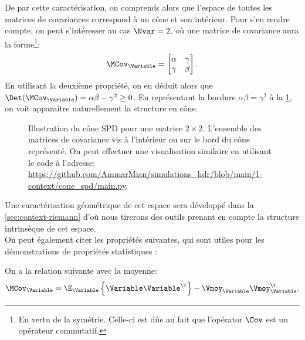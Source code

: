 \begin{remark}
De par cette caractérisation, on comprends alors que l'espace de toutes les matrices de covariances correspond à un cône et son intérieur. Pour s'en rendre compte, on peut s'intéresser au cas $\Nvar=2$, où une matrice de covariance aura la forme\footnote{En vertu de la symétrie. Celle-ci est dûe au fait que l'opérator $\Cov$ est un opérateur commutatif.}:
$$
\MCov_\Variable = \begin{bmatrix} \alpha & \gamma \\ \gamma & \beta \end{bmatrix}.
$$
En utilisant la deuxième propriété, on en déduit alors que $\Det(\MCov_\Variable) = \alpha\beta - \gamma^2 \geq 0$. En représentant la bordure $\alpha\beta=\gamma^2$ à la \cref{fig:context-figure-spdcone}, on voit apparaître naturellement la structure en cône.


\end{remark}

\begin{figure}[h]
    \begin{center}
    
  \end{center}
  \caption{Illustration du cône SPD pour une matrice $2\times 2$. L'ensemble des matrices de covariance vis à l'intérieur ou sur le bord du cône représenté. On peut effectuer une visualisation similaire en utilisant le code à l'adresse: \url{https://github.com/AmmarMian/simulations_hdr/blob/main/1-context/cone_spd/main.py}.}\label{fig:context-figure-spdcone}
  \end{figure}

Une caractérisation géométrique de cet espace sera développé dans la \cref{sec:context-riemann} d'où nous tirerons des outils prenant en compte la structure intrinsèque de cet espace. \\


On peut également citer les propriétés suivantes, qui sont utiles pour les démonstrations de propriétés statistiques :

\begin{property}
  \label{prop:context-definition-linkmoy}
  On a la relation suivante avec la moyenne:
  \begin{equation}
    \MCov_\Variable = \E_\Variable\left\{ \Variable\Variable^\T \right\} - \Vmoy_\Variable\Vmoy_\Variable^\T.
    \label{eq:context-definition-linkmoy}
  \end{equation}

\end{property}

